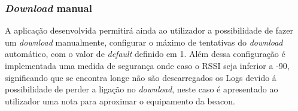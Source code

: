 
\subsubsection{\textit{Download} manual}
\par A aplicação desenvolvida permitirá ainda ao utilizador a possibilidade de fazer um \textit{download} manualmente, configurar o máximo de tentativas do \textit{download} automático, com o valor de \textit{default} definido em 1. Além dessa configuração é implementada uma medida de segurança onde caso o RSSI seja inferior a -90, significando que se encontra longe não são descarregados os Logs devido á possibilidade de perder a ligação no \textit{download}, neste caso é apresentado ao utilizador uma nota para aproximar o equipamento da beacon. %

